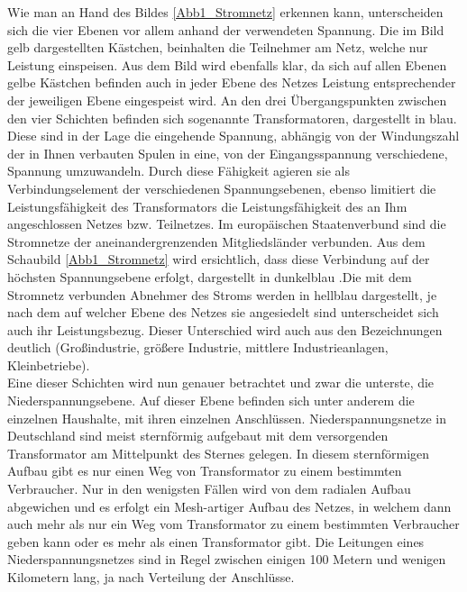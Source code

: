 Wie man an Hand des Bildes \ref{Abb1_Stromnetz} erkennen kann, unterscheiden sich die vier Ebenen vor allem anhand der verwendeten Spannung. Die im Bild gelb dargestellten Kästchen, beinhalten die Teilnehmer am Netz, welche nur Leistung einspeisen. Aus dem Bild wird ebenfalls klar, da sich auf allen Ebenen gelbe Kästchen befinden auch in jeder Ebene des Netzes Leistung entsprechender der jeweiligen Ebene eingespeist wird. An den drei Übergangspunkten zwischen den vier Schichten befinden sich sogenannte Transformatoren, dargestellt in blau. Diese sind in der Lage die eingehende Spannung, abhängig von der Windungszahl der in Ihnen verbauten Spulen in eine, von der Eingangsspannung verschiedene, Spannung umzuwandeln. Durch diese Fähigkeit agieren sie als Verbindungselement der verschiedenen Spannungsebenen, ebenso limitiert die Leistungsfähigkeit des Transformators die Leistungsfähigkeit des an Ihm angeschlossen Netzes bzw. Teilnetzes.
Im europäischen Staatenverbund sind die Stromnetze der aneinandergrenzenden Mitgliedsländer verbunden. Aus dem Schaubild \ref{Abb1_Stromnetz} wird ersichtlich, dass diese Verbindung auf der höchsten Spannungsebene erfolgt, dargestellt in dunkelblau .Die mit dem Stromnetz verbunden Abnehmer des Stroms werden in hellblau dargestellt, je nach dem auf welcher Ebene des Netzes sie angesiedelt sind unterscheidet sich auch ihr Leistungsbezug. Dieser Unterschied wird auch aus den Bezeichnungen deutlich (Großindustrie, größere Industrie, mittlere Industrieanlagen, Kleinbetriebe). \\
Eine dieser Schichten wird nun genauer betrachtet und zwar die unterste, die Niederspannungsebene. Auf dieser Ebene befinden sich unter anderem die einzelnen Haushalte, mit ihren einzelnen Anschlüssen. Niederspannungsnetze in Deutschland sind meist sternförmig aufgebaut mit dem versorgenden Transformator am Mittelpunkt des Sternes gelegen. In diesem sternförmigen Aufbau gibt es nur einen Weg von Transformator zu einem bestimmten Verbraucher. Nur in den wenigsten Fällen wird von dem radialen Aufbau abgewichen und es erfolgt ein Mesh-artiger Aufbau des Netzes, in welchem dann auch mehr als nur ein Weg vom Transformator zu einem bestimmten Verbraucher geben kann oder es mehr als einen Transformator gibt. Die Leitungen eines Niederspannungsnetzes sind in Regel zwischen einigen 100 Metern und wenigen Kilometern lang, ja nach Verteilung der Anschlüsse. \\

